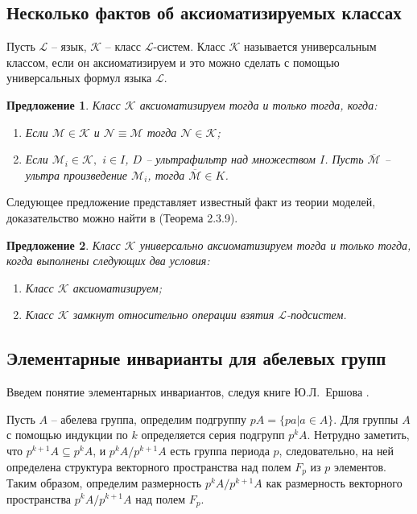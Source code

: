 \documentclass[a4paper,11pt,twoside]{article}
\newtheorem{proposition}{Предложение}[section]
\def\K{{\mathcal{K}}}
\def\L{{\mathcal{L}}}
\begin{document}
\subsection{Несколько фактов об аксиоматизируемых классах}

Пусть $\L$ -- язык, $\K$ -- класс $\L$-систем. Класс $\K$ называется универсальным классом, если он аксиоматизируем и это можно сделать с помощью универсальных формул языка $\L$.

\begin{proposition}\label{prop:AxiomClass}
Класс $\K$ аксиоматизируем тогда и только тогда, когда:
\begin{enumerate}
\item Если $\mathcal{M} \in \K$ и $\mathcal{N} \equiv \mathcal{M}$ тогда $\mathcal{N} \in \K$;
\item Если $\mathcal{M}_i \in \K,$ $i \in I$, $D$ -- ультрафильтр над множеством $I$. Пусть $\overline{\mathcal{M}}$ -- ультра произведение $\mathcal{M}_i$, тогда $\overline{\mathcal{M}} \in K$.
\end{enumerate}
\end{proposition}

Следующее предложение представляет известный факт из теории моделей, доказательство можно найти в \cite{DM} (Теорема 2.3.9).
\begin{proposition}\label{prop:AxiomClass2}
Класс $\K$ универсально аксиоматизируем тогда и только тогда, когда выполнены следующих два условия:
\begin{enumerate}
\item Класс $\K$ аксиоматизируем;
\item Класс $\K$ замкнут относительно операции взятия $\L$-подсистем.
\end{enumerate}
\end{proposition}



\subsection{Элементарные инварианты для абелевых групп}\label{sec:UnivInvariants}

Введем понятие элементарных инвариантов, следуя книге Ю.Л.~Ершова \cite{Ershov}.

Пусть $A$ -- абелева группа, определим подгруппу $pA = \{ pa | a \in A\}$. Для группы $A$ с помощью индукции по $k$ определяется серия подгрупп $p^k A$. Нетрудно заметить, что $p^{k+1} A \subseteq p^k A$, и $p^k A \Big/ p^{k+1} A$ есть группа периода $p$, следовательно, на ней определена структура векторного пространства над полем $F_p$ из $p$ элементов. Таким образом, определим размерность $p^k A \Big/ p^{k+1} A$ как размерность векторного пространства $p^k A \Big/ p^{k+1} A$ над полем $F_p$.
\end{document}
